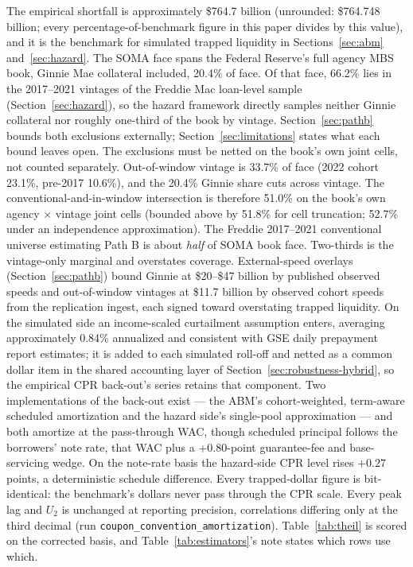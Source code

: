 \documentclass[12pt]{article}
\begin{document}
The empirical shortfall is approximately \$764.7 billion (unrounded: \$764.748 billion; every percentage-of-benchmark figure in this paper divides by this value), and it is the benchmark for simulated trapped liquidity in Sections~\ref{sec:abm} and~\ref{sec:hazard}. The SOMA face spans the Federal Reserve's full agency MBS book, Ginnie Mae collateral included, 20.4\% of face. Of that face, 66.2\% lies in the 2017--2021 vintages of the Freddie Mac loan-level sample (Section~\ref{sec:hazard}), so the hazard framework directly samples neither Ginnie collateral nor roughly one-third of the book by vintage. Section~\ref{sec:pathb} bounds both exclusions externally; Section~\ref{sec:limitations} states what each bound leaves open. The exclusions must be netted on the book's own joint cells, not counted separately. Out-of-window vintage is 33.7\% of face (2022 cohort 23.1\%, pre-2017 10.6\%), and the 20.4\% Ginnie share cuts across vintage. The conventional-and-in-window intersection is therefore 51.0\% on the book's own agency $\times$ vintage joint cells (bounded above by 51.8\% for cell truncation; 52.7\% under an independence approximation). The Freddie 2017--2021 conventional universe estimating Path B is about \emph{half} of SOMA book face. Two-thirds is the vintage-only marginal and overstates coverage. External-speed overlays (Section~\ref{sec:pathb}) bound Ginnie at \$20--\$47 billion by published observed speeds and out-of-window vintages at \$11.7 billion by observed cohort speeds from the replication ingest, each signed toward overstating trapped liquidity. On the simulated side an income-scaled curtailment assumption enters, averaging approximately 0.84\% annualized and consistent with GSE daily prepayment report estimates; it is added to each simulated roll-off and netted as a common dollar item in the shared accounting layer of Section~\ref{sec:robustness-hybrid}, so the empirical CPR back-out's series retains that component. Two implementations of the back-out exist --- the ABM's cohort-weighted, term-aware scheduled amortization and the hazard side's single-pool approximation --- and both amortize at the pass-through WAC, though scheduled principal follows the borrowers' note rate, that WAC plus a $+0.80$-point guarantee-fee and base-servicing wedge. On the note-rate basis the hazard-side CPR level rises $+0.27$ points, a deterministic schedule difference. Every trapped-dollar figure is bit-identical: the benchmark's dollars never pass through the CPR scale. Every peak lag and $U_2$ is unchanged at reporting precision, correlations differing only at the third decimal (run \texttt{coupon\_convention\_amortization}). Table~\ref{tab:theil} is scored on the corrected basis, and Table~\ref{tab:estimators}'s note states which rows use which.
\end{document}
